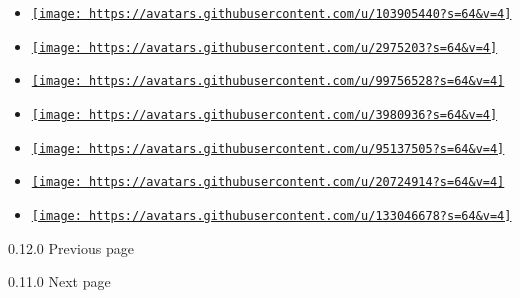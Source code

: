 \begin{itemize}
\item
  \href{https://github.com/Tom4sCruz}{\texttt{[image: https://avatars.githubusercontent.com/u/103905440?s=64\&v=4]}}
\item
  \href{https://github.com/bluebear94}{\texttt{[image: https://avatars.githubusercontent.com/u/2975203?s=64\&v=4]}}
\item
  \href{https://github.com/etiennecollin}{\texttt{[image: https://avatars.githubusercontent.com/u/99756528?s=64\&v=4]}}
\item
  \href{https://github.com/gabriel-araujjo}{\texttt{[image: https://avatars.githubusercontent.com/u/3980936?s=64\&v=4]}}
\item
  \href{https://github.com/joserlopes}{\texttt{[image: https://avatars.githubusercontent.com/u/95137505?s=64\&v=4]}}
\item
  \href{https://github.com/rikhuijzer}{\texttt{[image: https://avatars.githubusercontent.com/u/20724914?s=64\&v=4]}}
\item
  \href{https://github.com/wrzian}{\texttt{[image: https://avatars.githubusercontent.com/u/133046678?s=64\&v=4]}}
\end{itemize}

\href{/docs/changelog/0.12.0/}{\pandocbounded{}}

{ 0.12.0 } { Previous page }

\href{/docs/changelog/0.11.0/}{\pandocbounded{}}

{ 0.11.0 } { Next page }
